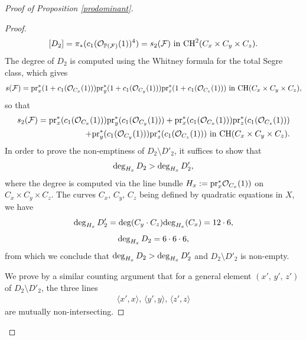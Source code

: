 \documentclass[10pt]{article}
\begin{document}
\begin{proof}[Proof of Proposition \ref{prodominant}]
\begin{proof}
$$[D_2]=\pi_* (c_1(\mathcal{O}_{\mathbb{P}(\mathcal{F})}(1))^4)=s_2(\mathcal{F})\,\,{\rm in}\,\,{\rm CH}^2(C_x\times C_y\times C_z).$$
The degree  of $D_2$ is computed using the Whitney formula for  the total Segre class, which gives
$$ s(\mathcal{F})={\rm pr}_x^*( 1+c_1(\mathcal{O}_{C_x}(1))){\rm pr}_y^*( 1+c_1(\mathcal{O}_{C_y}(1))){\rm pr}_z^*( 1+c_1(\mathcal{O}_{C_z}(1))) \,\,{\rm in}\,\,{\rm CH}(C_x\times C_y\times C_z),$$
so that
\begin{eqnarray} \label{eqpoursegre2} s_2(\mathcal{F})={\rm pr}_x^*(c_1(\mathcal{O}_{C_x}(1))){\rm pr}_y^*( c_1(\mathcal{O}_{C_y}(1)))+{\rm pr}_x^*(c_1(\mathcal{O}_{C_x}(1))){\rm pr}_z^*(c_1(\mathcal{O}_{C_z}(1)))\\
\nonumber +{\rm pr}_y^*(c_1(\mathcal{O}_{C_y}(1))){\rm pr}_z^*(c_1(\mathcal{O}_{C_z}(1))) \,\,{\rm in}\,\,{\rm CH}(C_x\times C_y\times C_z).
\end{eqnarray}
In order  to prove the non-emptiness of $D_2\setminus D'_2$, it suffices to  show that
$${\rm deg}_{H_x}\,D_2> {\rm deg}_{H_x}\,D'_2,$$ where the degree is computed via the line bundle $H_x:={\rm pr}_x^*\mathcal{O}_{C_x}(1))$ on $C_x\times C_y\times C_z$.
The curves $C_x,\,C_y,\,C_z$ being defined by quadratic equations in $X$, we have  $${\rm deg}_{H_x}\,D'_2={\rm deg}(C_y\cdot C_z){\rm deg}_{H_x}(C_x)=12\cdot 6,$$
$${\rm deg}_{H_x}\,D_2=6\cdot 6\cdot 6,$$
from which we conclude that ${\rm deg}_{H_x}\,D_2> {\rm deg}_{H_x}\,D'_2$ and $D_2\setminus D'_2$ is non-empty.

We prove by a similar counting argument that for a general element $(x',\,y',\,z')$ of $D_2\setminus D'_2$, the three lines \begin{eqnarray}\label{eq3lines}\langle x',x\rangle, \,\langle y',y\rangle, \,\langle z',z\rangle \end{eqnarray} are mutually non-intersecting.





\end{proof}
\end{proof}
\end{document}
